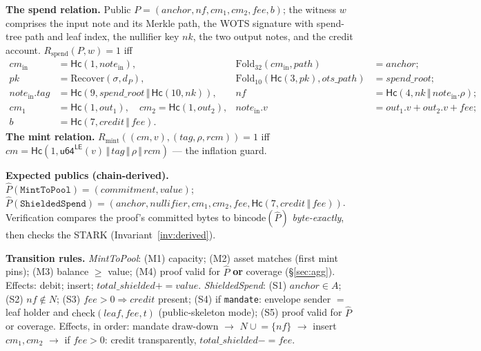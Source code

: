 \documentclass[10pt]{article}
\newcommand{\ct}[1]{\texttt{#1}}
\newcommand{\Hc}{\mathsf{Hc}}
\newcommand{\cat}{\,\Vert\,}
\begin{document}
\textbf{The spend relation.} Public $P = (\mathit{anchor}, \mathit{nf}, \mathit{cm}_1, \mathit{cm}_2, \mathit{fee}, b)$; the witness $w$ comprises the input note and its Merkle path, the WOTS signature with spend-tree path and leaf index, the nullifier key $\mathit{nk}$, the two output notes, and the credit account. $R_{\mathrm{spend}}(P, w) = 1$ iff
\begin{align}
\mathit{cm}_{\mathrm{in}} &= \Hc(1, \mathit{note}_{\mathrm{in}}), & \mathrm{Fold}_{32}(\mathit{cm}_{\mathrm{in}}, \mathit{path}) &= \mathit{anchor};\\
\mathit{pk} &= \mathrm{Recover}(\sigma, d_P), & \mathrm{Fold}_{10}(\Hc(3,\mathit{pk}), \mathit{ots\_path}) &= \mathit{spend\_root};\\
\mathit{note}_{\mathrm{in}}.\mathit{tag} &= \Hc(9, \mathit{spend\_root}\cat\Hc(10,\mathit{nk})), & \mathit{nf} &= \Hc(4, \mathit{nk}\cat\mathit{note}_{\mathrm{in}}.\rho);\\
\mathit{cm}_1 &= \Hc(1, \mathit{out}_1),\quad \mathit{cm}_2 = \Hc(1, \mathit{out}_2), & \mathit{note}_{\mathrm{in}}.v &= \mathit{out}_1.v + \mathit{out}_2.v + \mathit{fee};\\
b &= \Hc(7, \mathit{credit}\cat \mathit{fee}). &&
\end{align}
\textbf{The mint relation.} $R_{\mathrm{mint}}((\mathit{cm}, v), (\mathit{tag},\rho,\mathit{rcm})) = 1$ iff $\mathit{cm} = \Hc(1, \mathsf{u64^{LE}}(v)\cat\mathit{tag}\cat\rho\cat\mathit{rcm})$ --- the inflation guard.

\textbf{Expected publics (chain-derived).} $\hat P(\ct{MintToPool}) = (\mathit{commitment}, \mathit{value})$; $\hat P(\ct{ShieldedSpend}) = (\mathit{anchor}, \mathit{nullifier}, \mathit{cm}_1, \mathit{cm}_2, \mathit{fee}, \Hc(7, \mathit{credit}\cat\mathit{fee}))$. Verification compares the proof's committed bytes to $\mathrm{bincode}(\hat P)$ \emph{byte-exactly}, then checks the STARK (Invariant~\ref{inv:derived}).

\textbf{Transition rules.} \emph{MintToPool}: (M1) capacity; (M2) asset matches (first mint pins); (M3) balance $\ge$ value; (M4) proof valid for $\hat P$ \textbf{or} coverage (\S\ref{sec:agg}). Effects: debit; insert; $\mathit{total\_shielded}{+}{=}\mathit{value}$. \emph{ShieldedSpend}: (S1) $\mathit{anchor} \in A$; (S2) $\mathit{nf} \notin N$; (S3) $\mathit{fee}>0 \Rightarrow \mathit{credit}$ present; (S4) if \ct{mandate}: envelope sender $=$ leaf holder and $\mathrm{check}(\mathit{leaf}, \mathit{fee}, t)$ (public-skeleton mode); (S5) proof valid for $\hat P$ or coverage. Effects, in order: mandate draw-down $\to$ $N \cup\!= \{\mathit{nf}\}$ $\to$ insert $\mathit{cm}_1, \mathit{cm}_2$ $\to$ if $\mathit{fee}>0$: credit transparently, $\mathit{total\_shielded}{-}{=}\mathit{fee}$.
\end{document}
